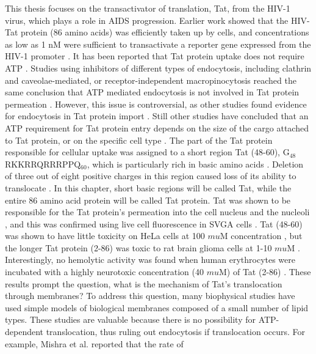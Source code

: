 This thesis focuses on 
the transactivator of translation, Tat, from the HIV-1 virus, which plays a 
role in AIDS progression. Earlier work showed that the HIV-Tat 
protein (86 amino acids) was efficiently taken up by cells, and concentrations 
as low as 1 nM were sufficient to transactivate a reporter gene expressed from 
the HIV-1 promoter \cite{Frankel88,Green88}. 
It has been reported that Tat protein uptake does not 
require ATP \cite{Vives97}. 
Studies using inhibitors of different types of endocytosis, 
including clathrin and caveolae-mediated, or receptor-independent 
macropinocytosis reached the same conclusion that ATP mediated endocytosis is 
not involved in Tat protein permeation 
\cite{Ter-Avetisyan09,Duchardt07,Tunnemann06,Ziegler05}. 
However, this issue is 
controversial, as other studies found evidence for endocytosis in Tat protein 
import \cite{Wadia04,Kaplan05,Mann91,Richard05,Jones05,Vendeville04,Foerg05,Fittipaldi05,Liu00}. 
Still other studies have concluded that an ATP requirement for 
Tat protein entry depends on the size of the cargo attached to Tat protein, or 
on the specific cell type \cite{Torchilin01,Torchilin03,Rudolph03}. 
The part of the Tat protein responsible for 
cellular uptake was assigned to a short region Tat (48-60), G$_48$RKKRRQRRRPPQ$_60$, 
which is particularly rich in basic amino acids \cite{Vives97}. 
Deletion of three out of 
eight positive charges in this region caused loss of its ability to translocate 
\cite{Vives97}. 
In this chapter, short basic regions will be called Tat, while the 
entire 86 amino acid protein will be called Tat protein. 
Tat was shown to be responsible for the Tat
protein’s permeation into the cell nucleus and the nucleoli \cite{Vives97}, 
and this was confirmed using live cell fluorescence in SVGA cells \cite{Chauhan07}. 
Tat (48-60) was shown to have little toxicity on HeLa cells at 100 $mu$M 
concentration \cite{Vives97}, but the longer Tat protein (2-86) was toxic 
to rat brain glioma cells at 1-10 $mu$M \cite{Sabatier91}. 
Interestingly, no hemolytic activity was found when human erythrocytes
were incubated with a highly neurotoxic concentration (40 $mu$M) of Tat (2-86) 
\cite{Sabatier91}. 
These results prompt the question, what is the mechanism of Tat’s translocation through 
membranes?
To address this question, many biophysical studies have used simple models of
biological membranes composed of a small number of lipid types. These studies 
are valuable
because there is no possibility for ATP-dependent translocation, thus ruling 
out endocytosis if
translocation occurs. For example, Mishra et al. reported that the rate of 
